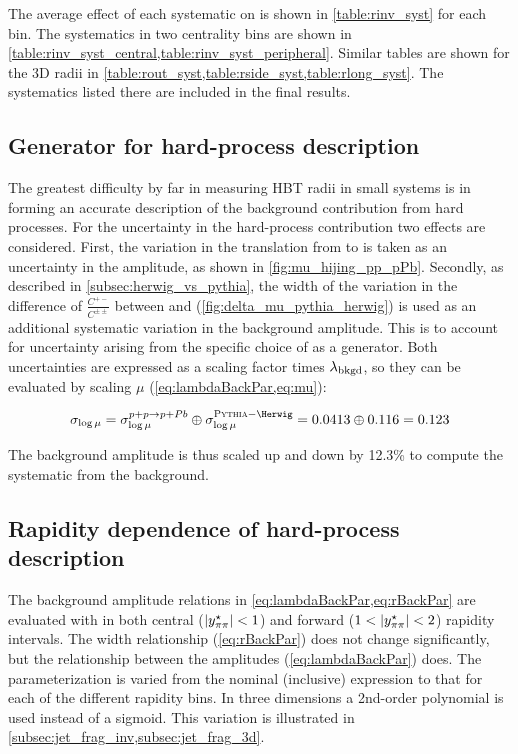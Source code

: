 The average effect of each systematic on \Rinv is shown in \cref{table:rinv_syst} for each \kt bin.
The systematics in two centrality bins are shown in \cref{table:rinv_syst_central,table:rinv_syst_peripheral}.
Similar tables are shown for the 3D radii in \cref{table:rout_syst,table:rside_syst,table:rlong_syst}.
The systematics listed there are included in the final results.

\subsection{Generator for hard-process description}
The greatest difficulty by far in measuring HBT radii in small systems is in forming an accurate description of the background contribution from hard processes.
For the uncertainty in the hard-process contribution two effects are considered.
First, the variation in the translation from \pp to \pPb is taken as an uncertainty in the amplitude, as shown in \cref{fig:mu_hijing_pp_pPb}.
Secondly, as described in \cref{subsec:herwig_vs_pythia}, the width of the variation in the difference of $\frac{C^{+-}}{C^{\pm\pm}}$ between \Pythia and \Herwig (\cref{fig:delta_mu_pythia_herwig}) is used as an additional systematic variation in the background amplitude.
This is to account for uncertainty arising from the specific choice of \Pythia as a generator.
Both uncertainties are expressed as a scaling factor times $\lambda_{\mathrm{bkgd}}$, so they can be evaluated by scaling $\mu$ (\cref{eq:lambdaBackPar,eq:mu}):

\begin{equation}
\sigma_{\log \mu} = \sigma^{p+p \rightarrow p+Pb}_{\log \mu} \oplus \sigma^{\Pythia-\Herwig}_{\log \mu} = 0.0413 \oplus 0.116 = 0.123
\end{equation}

The background amplitude \lbkgd is thus scaled up and down by 12.3\% to compute the systematic from the background.

\subsection{Rapidity dependence of hard-process description}

The background amplitude relations in \cref{eq:lambdaBackPar,eq:rBackPar} are evaluated with \Pythia in both central ($|y^{\star}_{\pi\pi}| < 1$) and forward ($1 < |y^{\star}_{\pi\pi}| < 2$) rapidity intervals.
The width relationship (\cref{eq:rBackPar}) does not change significantly, but the relationship between the amplitudes (\cref{eq:lambdaBackPar}) does.
The parameterization is varied from the nominal (inclusive) expression to that for each of the different rapidity bins.
In three dimensions a 2nd-order polynomial is used instead of a sigmoid.
This variation is illustrated in \cref{subsec:jet_frag_inv,subsec:jet_frag_3d}.

